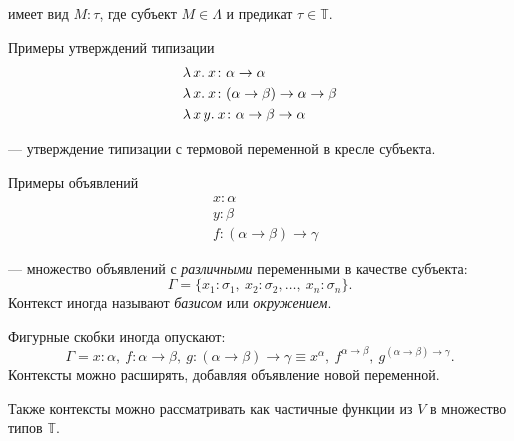 \documentclass[11pt,a4paper]{article}
\begin{document}
\begin{defn}
	 имеет вид $ M \colon  \tau $, где субъект $ M \in \Lambda$ и предикат $ \tau \in \mathbb{T}$.
\end{defn}
\begin{ex}
	Примеры утверждений типизации
    \[
    \begin{aligned}
		&\lambda\,{x}.\:{x} \colon \alpha \to \alpha \\
		& \lambda\,{x}.\:{x}\colon ( \alpha  \to  \beta ) \to \alpha \to  \beta \\
		& \lambda\,{x \, y}.\:{x} \colon  \alpha  \to \beta  \to \alpha 
    \end{aligned}
    \]
\end{ex}
\begin{defn}[Объвление]
	 --- утверждение типизации с термовой переменной в кресле субъекта.
\end{defn}
\begin{ex}
    Примеры объявлений
	\[
	\begin{aligned}
		&x \colon \alpha \\
		&y \colon \beta \\
		&f \colon ( \alpha  \to  \beta ) \to \gamma 
	\end{aligned}
	\]
\end{ex}
\begin{defn}[Контекст]
	 --- множество объявлений с \textit{различными} переменными в качестве субъекта:
	\[
	\Gamma = \{x_1\colon \sigma _1, ~ x_2\colon \sigma _2, \ldots , ~ x_{n} \colon \sigma_{n}\}
	.\] 
	Контекст иногда называют \textit{базисом} или \textit{окружением}.
\end{defn}
Фигурные скобки иногда опускают:
\[
	\Gamma = x\colon \alpha , ~ f\colon \alpha \to \beta , ~ g\colon ( \alpha \to  \beta ) \to \gamma  \equiv x^{ \alpha }, ~ f^{ \alpha \to \beta }, ~ g ^{( \alpha \to  \beta ) \to  \gamma }
.\] 
Контексты можно расширять, добавляя объявление новой переменной.

Также контексты можно рассматривать как частичные функции из $ V$ в множество типов $ \mathbb{T}$.
\end{document}
